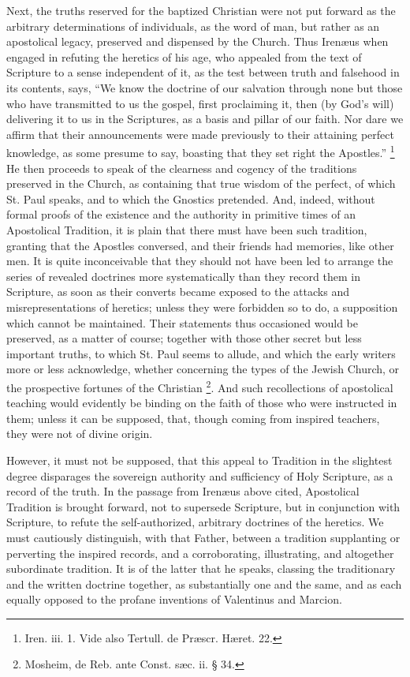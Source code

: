 Next, the truths reserved for the baptized Christian were not put
forward as the arbitrary determinations of individuals, as the word of
man, but rather as an apostolical legacy, preserved and dispensed by
the Church. Thus Irenæus when engaged in refuting the heretics of his
age, who appealed from the text of Scripture to a sense independent of
it, as the test between truth and falsehood in its contents, says,
``We know the doctrine of our salvation through none but those who
have transmitted to us the gospel, first proclaiming it, then (by God's
will) delivering it to us in the Scriptures, as a basis and pillar of
our faith. Nor dare we affirm that their announcements were made
previously to their attaining perfect knowledge, as some presume to
say, boasting that they set right the Apostles.'' \footnote{Iren. iii. 1. Vide also Tertull. de
Præscr. Hæret. 22.} He then proceeds to speak of the clearness and cogency of the
traditions preserved in the Church, as containing that true wisdom of
the perfect, of which St. Paul speaks, and to which the Gnostics
pretended. And, indeed, without formal proofs of the existence and the
authority in primitive times of an Apostolical Tradition, it is plain
that there must have been such tradition, granting that the Apostles
conversed, and their friends had memories, like other men. It is quite
inconceivable that they should not have been led to arrange the series
of revealed doctrines more systematically than they record them in
Scripture, as soon as their converts became exposed to the attacks and
misrepresentations of heretics; unless they were forbidden so to do, a
supposition which cannot be maintained. Their statements thus
occasioned would be preserved, as a matter of course; together with those other secret but less important truths, to which St. Paul
seems to allude, and which the early writers more or less acknowledge,
whether concerning the types of the Jewish Church, or the prospective
fortunes of the Christian \footnote{Mosheim, de Reb. ante Const. sæc. ii. §
34.}.
And such recollections of apostolical teaching would evidently be
binding on the faith of those who were instructed in them; unless it
can be supposed, that, though coming from inspired teachers, they were
not of divine origin.

However, it must not be supposed, that this appeal to Tradition in
the slightest degree disparages the sovereign authority and
sufficiency of Holy Scripture, as a record of the truth. In the
passage from Irenæus above cited, Apostolical Tradition is brought
forward, not to supersede Scripture, but in conjunction with
Scripture, to refute the self-authorized, arbitrary doctrines of the
heretics. We must cautiously distinguish, with that Father, between a
tradition supplanting or perverting the inspired records, and a
corroborating, illustrating, and altogether subordinate tradition. It
is of the latter that he speaks, classing the traditionary and the
written doctrine together, as substantially one and the same, and as
each equally opposed to the profane inventions of Valentinus and
Marcion.

